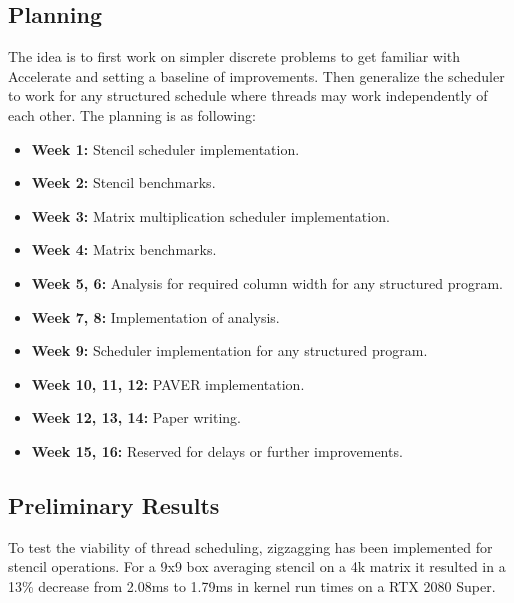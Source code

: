 \documentclass{article}
\begin{document}
\subsection{Planning}
The idea is to first work on simpler discrete problems to get familiar with Accelerate and setting a baseline of improvements.
Then generalize the scheduler to work for any structured schedule where threads may work independently of each other.
The planning is as following:
\begin{itemize}
    \item \textbf{Week 1:} Stencil scheduler implementation.
    \item \textbf{Week 2:} Stencil benchmarks.
    \item \textbf{Week 3:} Matrix multiplication scheduler implementation.
    \item \textbf{Week 4:} Matrix benchmarks.
    \item \textbf{Week 5, 6:} Analysis for required column width for any structured program.
    \item \textbf{Week 7, 8:} Implementation of analysis.
    \item \textbf{Week 9:} Scheduler implementation for any structured program.
    \item \textbf{Week 10, 11, 12:} PAVER implementation.
    \item \textbf{Week 12, 13, 14:} Paper writing.
    \item \textbf{Week 15, 16:} Reserved for delays or further improvements.
\end{itemize}

\subsection{Preliminary Results}
To test the viability of thread scheduling, zigzagging has been implemented for stencil operations.
For a 9x9 box averaging stencil on a 4k matrix it resulted in a 13\% decrease from 2.08ms to 1.79ms in kernel run times on a RTX 2080 Super.





\end{document}
